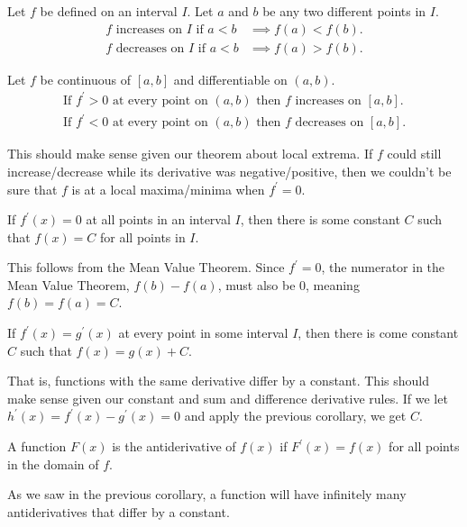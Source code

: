 \begin{definition}
	Let $f$ be defined on an interval $I$.
	Let $a$ and $b$ be any two different points in $I$.
	\begin{align*}
		\text{$f$ increases on $I$ if } a < b &\implies f(a) < f(b). \\
		\text{$f$ decreases on $I$ if } a < b &\implies f(a) > f(b).
	\end{align*}
\end{definition}

\begin{corollary}
	Let $f$ be continuous of $[a,b]$ and differentiable on $(a,b)$.
	\begin{align*}
		\text{If $f^\prime > 0$ at every point on $(a,b)$ then $f$ increases on $[a,b]$}. \\
		\text{If $f^\prime < 0$ at every point on $(a,b)$ then $f$ decreases on $[a,b]$}.
	\end{align*}
\end{corollary}

This should make sense given our theorem about local extrema.
If $f$ could still increase/decrease while its derivative was negative/positive, then we couldn't be sure that $f$ is at a local maxima/minima when $f^\prime=0$.

\begin{corollary}
	If $f^\prime(x) = 0$ at all points in an interval $I$, then there is some constant $C$ such that $f(x) = C$ for all points in $I$.
\end{corollary}

This follows from the Mean Value Theorem.
Since $f^\prime = 0$, the numerator in the Mean Value Theorem, $f(b) - f(a)$, must also be 0, meaning $f(b) = f(a) = C$.

\begin{corollary}
	If $f^\prime(x) = g^\prime(x)$ at every point in some interval $I$, then there is come constant $C$ such that $f(x) = g(x) + C$.
\end{corollary}

That is, functions with the same derivative differ by a constant.
This should make sense given our constant and sum and difference derivative rules.
If we let $h^\prime(x) = f^\prime(x) - g^\prime(x) = 0$ and apply the previous corollary, we get $C$.

\begin{definition}
	A function $F(x)$ is the antiderivative	of $f(x)$ if $F^\prime(x) = f(x)$ for all points in the domain of $f$.
\end{definition}

As we saw in the previous corollary, a function will have infinitely many antiderivatives that differ by a constant.